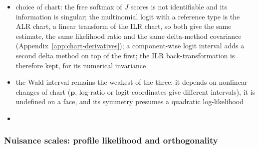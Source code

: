 \begin{itemize}
        endpoints by the inverse link, instead of applying the delta method to the fitted mean
        \cite[Sect.~4.2.5]{agrestiFoundationsLinearGeneralized2015}; a smooth, monotone map preserves quantiles,
        so for \(J=2\) the interval \(\psi(\hat\rho\pm z\,\mathrm{SE})\) keeps the coverage of the interval for \(\rho\) and stays
        inside \((0,1)\); for \(J>2\) the bijection \(\boldsymbol{\psi}\) maps joint regions exactly,
        \(\Pr(\boldsymbol{\rho}\in R)=\Pr\{\boldsymbol{p}\in\boldsymbol{\psi}(R)\}\), and marginal intervals for \(p_{j}\) are quantiles of
        \(\boldsymbol{\psi}(\boldsymbol{\rho}^{(b)})\) with \(\boldsymbol{\rho}^{(b)}\sim\mathcal{N}(\hat{\boldsymbol{\rho}},I_{\boldsymbol{\rho}}^{-1})\)
  \item choice of chart: the free softmax of \(J\) scores is not identifiable and its information is singular; the
        multinomial logit with a reference type is the ALR chart, a linear transform of the ILR chart, so both
        give the same estimate, the same likelihood ratio and the same delta-method covariance
        (Appendix~\ref{app:chart-derivatives}); a component-wise logit interval adds a second delta method on
        top of the first; the ILR back-transformation is therefore kept, for its numerical invariance
  \item the Wald interval remains the weakest of the three: it depends on nonlinear changes of chart
        (\(\boldsymbol{p}\), log-ratio or logit coordinates give different intervals), it is undefined on a face, and its
        symmetry presumes a quadratic log-likelihood
  \item[] 
\end{itemize}

\subsubsection{Nuisance scales: profile likelihood and orthogonality}
\label{app:mle-nuisance}


